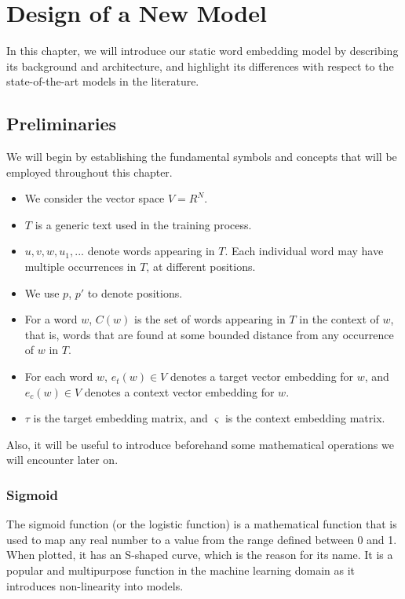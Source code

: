 
\chapter{Design of a New Model}
\label{chp:design}

In this chapter, we will introduce our static word embedding model by describing its background and architecture, and highlight its differences with respect to the state-of-the-art models in the literature.

\section{Preliminaries}
We will begin by establishing the fundamental symbols and concepts that will be employed throughout this chapter. 

\begin{itemize}
\item We consider the vector space $V = R^N$.
\item $T$ is a generic text used in the training process.
\item $u, v, w, u_1, . . .$ denote words appearing in $T$. Each individual word may have multiple occurrences in $T$, at different positions.
\item We use $p$, ${p}'$ to denote positions.
\item For a word $w$, $C(w)$ is the set of words appearing in $T$ in the context of $w$, that is, words that are found at some bounded distance from any occurrence of $w$ in $T$.
\item For each word $w$, $e_t(w)  \in V$ denotes a target vector embedding for $w$, and $e_c(w) \in V$ denotes a context vector embedding for $w$. 
\item $\tau$ is the target embedding matrix, and $\varsigma$ is the context embedding matrix.
\end{itemize}

Also, it will be useful to introduce beforehand some mathematical operations we will encounter later on.

\subsection{Sigmoid}
\label{sec:sigmoid}

The sigmoid function (or the logistic function) is a mathematical function that is used to map any real number to a value from the range defined between 0 and 1. When plotted, it has an S-shaped curve, which is the reason for its name. It is a popular and multipurpose function in the machine learning domain as it introduces non-linearity into models.

